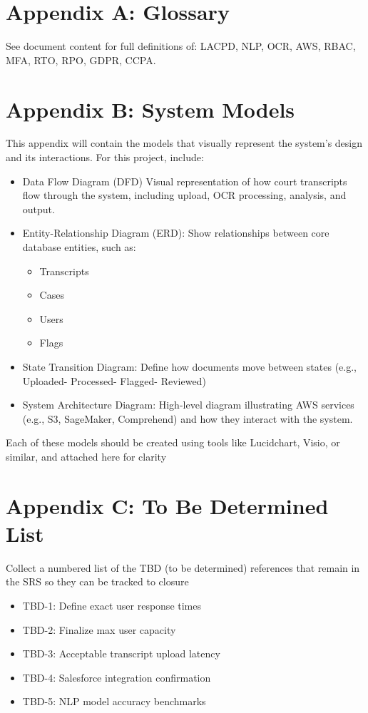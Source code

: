 \documentclass[12pt]{article}
\begin{document}
\section{Appendix A: Glossary}
See document content for full definitions of: LACPD, NLP, OCR, AWS, RBAC, MFA, RTO, RPO, GDPR, CCPA.

\section{Appendix B: System Models}
 This appendix will contain the models that visually represent the system's design and its
 interactions. For this project, include:
\begin{itemize}
  \item Data Flow Diagram (DFD)  Visual representation of how court transcripts flow through the
 system, including upload, OCR processing, analysis, and output.
  \item Entity-Relationship Diagram (ERD): Show relationships between core database entities,
 such as: 
	\begin{itemize}
		\item Transcripts
		\item Cases
		\item Users
		\item Flags
	\end{itemize}
  \item State Transition Diagram: Define how documents move between states (e.g., Uploaded-
 Processed- Flagged- Reviewed)
  \item System Architecture Diagram: High-level diagram illustrating AWS services (e.g., S3,
 SageMaker, Comprehend) and how they interact with the system.
\end{itemize}
 Each of these models should be created using tools like Lucidchart, Visio, or similar, and
 attached here for clarity

\section{Appendix C: To Be Determined List}
 Collect a numbered list of the TBD (to be determined) references that remain in the SRS so they
 can be tracked to closure
\begin{itemize}
  \item TBD-1: Define exact user response times
  \item TBD-2: Finalize max user capacity
  \item TBD-3: Acceptable transcript upload latency
  \item TBD-4: Salesforce integration confirmation
  \item TBD-5: NLP model accuracy benchmarks
\end{itemize}
\end{document}
